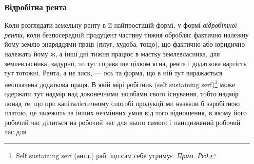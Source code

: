 \subsubsection{Відробітна рента}

Коли розглядати земельну ренту в її найпростішій формі, у формі \emph{відробітної
ренти}, коли безпосередній продуцент частину тижня обробляє фактично
належну йому землю знаряддями праці (плуг, худоба, тощо), що фактично
або юридично належать йому ж, а інші дні тижня працює в маєтку землевласника,
для землевласника, задурно, то тут справа ще цілком ясна, рента і додаткова вартість
тут тотожні. Рента, а не зиск, — ось та форма, що в ній тут виражається неоплачена
додаткова праця. В якій мірі робітник (self sustaining serf)\footnote*{
Self sustaining serf (англ.) раб, що сам себе утримує. \emph{Прим. Ред.}
} може одержати тут
надмір над доконечними засобами свого існування, тобто надмір понад те, що
при капіталістичному способі продукції ми назвали б заробітною платою, це
залежить за інших незмінних умов від того відношення, в якому його робочий
час ділиться на робочий час для нього самого і панщизняний робочий час для
\parbreak{}  %
